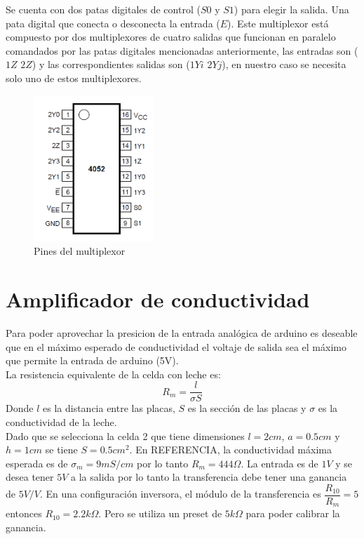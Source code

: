 Se cuenta con dos patas digitales de control ($S0$ y $S1$) para elegir la salida. Una pata digital que conecta o desconecta la entrada ($E$). Este multiplexor está compuesto por dos multiplexores de cuatro salidas que funcionan en paralelo comandados por las patas digitales mencionadas anteriormente, las entradas son ($1Z$ $2Z$) y las correspondientes salidas son ($1Yi$ $2Yj$), en nuestro caso se necesita solo uno de estos multiplexores.


\begin{figure}[H]
\centering
\includegraphics[width=0.4\textwidth]{mux/mux_pins.png}
\caption{Pines del multiplexor}
\label{fig:mux_pins}
\end{figure}


\section{Amplificador de conductividad}
Para poder aprovechar la presicion de la entrada analógica de arduino es deseable que en el máximo esperado de conductividad el voltaje de salida sea el máximo que permite la entrada de arduino (5V).\\

La resistencia equivalente de la celda con leche es:\\
\begin{equation}
R_{m} =\dfrac{l}{\sigma S}
\label{eq:Rm}
\end{equation}
Donde $l$ es la distancia entre las placas, $S$ es la sección de las placas y $\sigma$ es la conductividad de la leche.\\

Dado que se selecciona la celda 2 que tiene dimensiones $l=2cm$, $a=0.5cm$ y $h=1cm$ se tiene $S=0.5cm^{2}$. En REFERENCIA, la conductividad máxima esperada es de $\sigma_{m}=9 mS/cm$ por lo tanto $R_{m}=444\Omega$. La entrada es de $1V$ y se desea tener $5V$ a la salida por lo tanto la transferencia debe tener una ganancia de $5V/V$. En una configuración inversora, el módulo de la transferencia es $\dfrac{R_{10}}{R_{m}}=5$ entonces $R_{10}=2.2k\Omega$.  Pero se utiliza un preset de $5k\Omega$ para poder calibrar la ganancia.